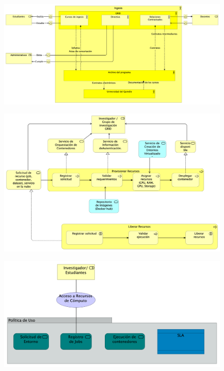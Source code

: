 \begin{figure}[H]
    \centering
    \includegraphics[width=\textwidth]{tablas-images/cp6/Actor-Cooperation-view.png}
\end{figure}
\begin{figure}[H]
    \centering
    \includegraphics[width=\textwidth]{tablas-images/cp6/Business-Cooperation-View.png}
\end{figure}
\begin{figure}[H]
    \centering
    \includegraphics[width=\textwidth]{tablas-images/cp6/Business-Product-View.png}
\end{figure}
